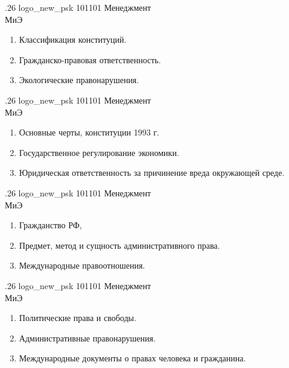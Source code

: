 \documentclass[
	12pt,
	a4paper,
	]
	{article}
\newcommand{\shapkFull}{
	\shapk
		{.26}
		{logo_new_psk}
		{101101}
		{Менеджмент\\}
		{МиЭ}
		{}
}
\begin{document}
\newpage


\shapkFull
\setcounter{zad}{0}

\begin{enumerate}
	\item Классификация конституций.

	\item Гражданско-правовая ответственность.

	\item Экологические  правонарушения.

\end{enumerate}

\newpage


\shapkFull
\setcounter{zad}{0}

\begin{enumerate}
	\item Основные черты,  конституции 1993 г.

	\item Государственное регулирование экономики.

	\item Юридическая ответственность за причинение вреда окружающей   среде.

\end{enumerate}

\newpage


\shapkFull
\setcounter{zad}{0}

\begin{enumerate}
	\item Гражданство РФ,

	\item Предмет, метод и сущность административного права.

	\item Международные правоотношения.                

\end{enumerate}

\newpage


\shapkFull
\setcounter{zad}{0}

\begin{enumerate}
	\item Политические права и свободы.

	\item Административные правонарушения.

	\item Международные документы о правах человека и гражданина.

\end{enumerate}
\end{document}
